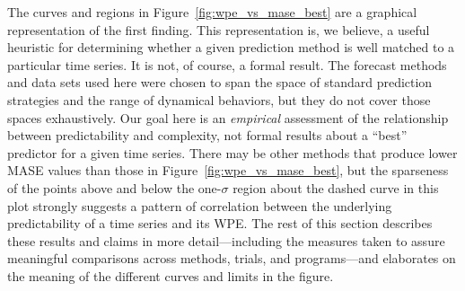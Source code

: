 The curves and regions in Figure~\ref{fig:wpe_vs_mase_best} are a
graphical representation of the first finding.  This representation
is, we believe, a useful heuristic for determining whether a given
prediction method is well matched to a particular time series.  It is
not, of course, a formal result.  The forecast methods and data sets
used here were chosen to span the space of standard prediction
strategies and the range of dynamical behaviors, but they do not cover
those spaces exhaustively.  Our goal here is an \emph{empirical}
assessment of the relationship between predictability and complexity,
not formal results about a ``best'' predictor for a given time series.
There may be other methods that produce lower MASE values than those
in Figure~\ref{fig:wpe_vs_mase_best}, but the sparseness of the points
above and below the one-$\sigma$ region about the dashed curve in this
plot strongly suggests a pattern of correlation between the underlying
predictability of a time series and its WPE.  The rest of this section
describes these results and claims in more detail---including the
measures taken to assure meaningful comparisons across methods,
trials, and programs---and elaborates on the meaning of the different
curves and limits in the figure.

